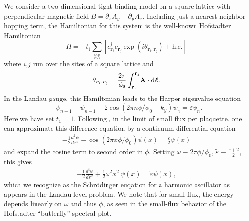\documentclass[aps,twocolumn,letterpaper,twoside,nobalancelastpage,groupedaddress,amsmath,amssymb,floatfix,citeautoscript]{revtex4-1}
\begin{document}
We consider a two-dimensional tight binding model on a square lattice with perpendicular magnetic field $B=\partial_x A_y - \partial_y A_x$. Including just a nearest neighbor hopping term, the Hamiltonian for this system is the well-known Hofstadter Hamiltonian \cite{Harper:1955ft,Hofstadter:1976js}
\[
\label{eq-hof}
H = -t_1 \sum_{\langle i j \rangle} \left[ c_{\bm{r}_i}^{\dagger} c_{\bm{r}_j} \exp\left(i\theta_{\bm{r}_i,\bm{r}_j}\right)  + \text{h.c.} \right]
\]
where $i$,$j$ run over the sites of a square lattice and
\begin{equation*}
\theta_{\bm{r}_i,\bm{r}_j}= \frac{2\pi}{\phi_0}\int_{{\bf r}_{i}}^{{\bf r}_{j}} \! \bf{A} \cdot \text{d} \bm{\ell}.
\end{equation*}
In the Landau gauge, this Hamiltonian leads to the Harper eigenvalue equation
\[
\label{eq-harper}
-\psi_{n+1} - \psi_{n-1} -  2\cos(2 \pi n \phi/\phi_0 - k_{y}) \psi_{n} = \varepsilon \psi_{n}.
\]
Here we have set $t_1=1$. Following \cite{Harper:2014vi}, in the limit of small flux per plaquette, one can approximate this difference equation by a continuum differential equation
\begin{align*}
-\frac{1}{2}\frac{d^2\psi}{dx^2} - \cos\left(2\pi x \phi/\phi_0 \right)\psi(x) = \frac{\varepsilon}{2}\psi(x)
\end{align*}
and expand the cosine term to second order in $\phi$. Setting $\omega \equiv 2\pi\phi/\phi_0$, $\tilde{\varepsilon} \equiv \frac{\varepsilon +2}{2}$, this gives
\begin{align}
\label{eq:landau-hamiltonian}
-\frac{1}{2}\frac{d^2\psi}{dx^2} + \frac{1}{2}\omega^2 x^2~\psi(x) = \tilde{\varepsilon}\psi(x) ,
\end{align}
which we recognize as the Schr{\"o}dinger euqation for a harmonic oscillator as appears in the Landau level problem. We note that for small flux, the energy depends linearly on $\omega$ and thus $\phi$, as seen in the small-flux behavior of the Hofstadter ``butterfly'' spectral plot.

\end{document}
